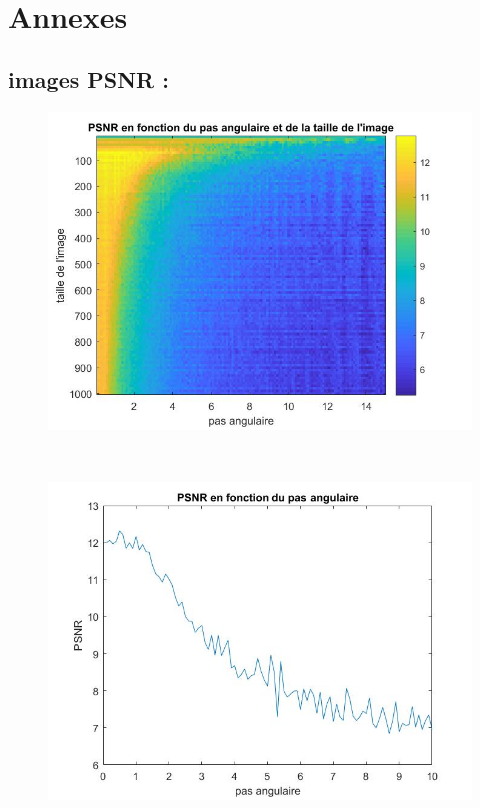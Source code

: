 \documentclass[conference]{IEEEtran}
\begin{document}
\newpage
\newpage $ $
\newpage

\section{Annexes}

\subsection{images PSNR : }
\begin{figure}[H]
\centering
\includegraphics[scale=1, angle=-90]{fig2}
\label{fig:gallery}
\end{figure}

\newpage $ $
\newpage

\begin{figure}[H]
\centering
\includegraphics[scale=1, angle=-90]{PSNR_en_fonction_du_pas_angulaire}
\label{fig:gallery}
\end{figure}
\end{document}
